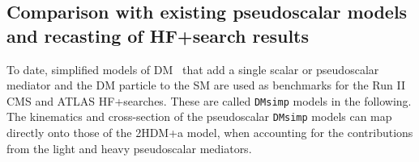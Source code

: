 \subsection{Comparison with existing pseudoscalar models and recasting of HF+\MET search results}
\label{sub:DMHF_rescaling}

To date, simplified models of DM~\cite{Abercrombie:2015wmb,Backovic:2015soa} that add a single scalar or pseudoscalar mediator and the DM particle to the SM are used as benchmarks for the Run II CMS and ATLAS HF+\MET searches. These are called \texttt{DMsimp} models in the following. The kinematics and cross-section of the pseudoscalar \texttt{DMsimp} models can map directly onto those of the 2HDM+a model, when accounting for the contributions from the light and heavy pseudoscalar mediators.



